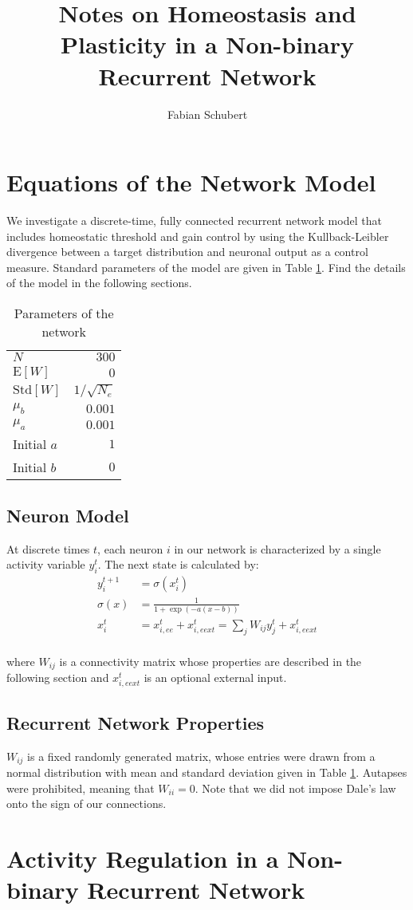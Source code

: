 \documentclass[10pt,a4paper]{article}
\author{Fabian Schubert}
\title{Notes on Homeostasis and Plasticity in a Non-binary Recurrent Network}
\begin{document}
\section{Equations of the Network Model}
We investigate a discrete-time, fully connected recurrent network model that includes homeostatic threshold and gain control by using the Kullback-Leibler divergence between a target distribution and neuronal output as a control measure. Standard parameters of the model are given in Table \ref{tab:parameters}. Find the details of the model in the following sections.
\begin{table}
\centering
\caption{Parameters of the network}

\begin{tabular}{l|r}
$N$ & $300$ \\
$\mathrm{E}[W]$ &  $0$\\
$\mathrm{Std}[W]$ & $1/\sqrt{N_e}$ \\
$\mu_b$ & $0.001$ \\
$\mu_a$ & $0.001$ \\
Initial $a$ & $1$ \\
Initial $b$ & $0$
\end{tabular}
\label{tab:parameters}
\end{table}

\subsection{Neuron Model}
At discrete times $t$, each neuron $i$ in our network is characterized by a single activity variable $y^t_i$. The next state is calculated by:
\begin{align}
y^{t+1}_i &= \sigma\left(x^t_i\right) \\
\sigma(x) &= \frac{1}{1+\exp(-a(x-b))} \\
x^t_i &= x^t_{i,ee} + x^t_{i,eext} = \sum_j W_{ij} y^t_j  + x^t_{i,eext} \\
\end{align}

where $W_{ij}$ is a connectivity matrix whose properties are described in the following section and $x^t_{i,eext}$ is an optional external input.

\subsection{Recurrent Network Properties}
$W_{ij}$ is a fixed randomly generated matrix, whose entries were drawn from a normal distribution with mean and standard deviation given in Table \ref{tab:parameters}. Autapses were prohibited, meaning that $W_{ii} = 0$. Note that we did not impose Dale's law onto the sign of our connections.


\section{Activity Regulation in a Non-binary Recurrent Network}
\end{document}
